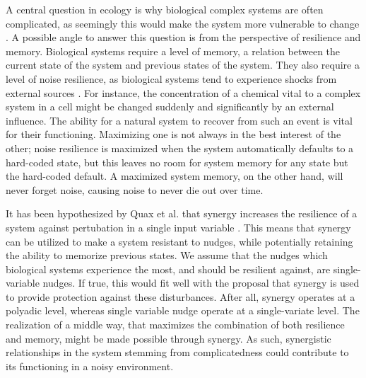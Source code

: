 \documentclass[../main.tex]{subfiles}
\begin{document}
A central question in ecology is why biological complex systems are often complicated, as seemingly this would make the system more vulnerable to change \cite{macarthur1955fluctuations, kondoh2003foraging}.
A possible angle to answer this question is from the perspective of resilience and memory.
Biological systems require a level of memory, a relation between the current state of the system and previous states of the system. 
They also require a level of noise resilience, as biological systems tend to experience shocks from external sources \cite{peixoto2012emergence}. %
For instance, the concentration of a chemical vital to a complex system in a cell might be changed suddenly and significantly by an external influence.
The ability for a natural system to recover from such an event is vital for their functioning.
Maximizing one is not always in the best interest of the other; noise resilience is maximized when the system automatically defaults to a hard-coded state, but this leaves no room for system memory for any state but the hard-coded default.
A maximized system memory, on the other hand, will never forget noise, causing noise to never die out over time.

It has been hypothesized by Quax et al. that synergy increases the resilience of a system against pertubation in a single input variable \cite{quax2017quantifying}.
This means that synergy can be utilized to make a system resistant to nudges, while potentially retaining the ability to memorize previous states.
We assume that the nudges which biological systems experience the most, and should be resilient against, are single-variable nudges.
If true, this would fit well with the proposal that synergy is used to provide protection against these disturbances.
After all, synergy operates at a polyadic level, whereas single variable nudge operate at a single-variate level.
The realization of a middle way, that maximizes the combination of both resilience and memory, might be made possible through synergy.
As such, synergistic relationships in the system stemming from complicatedness could contribute to its functioning in a noisy environment.
\end{document}
